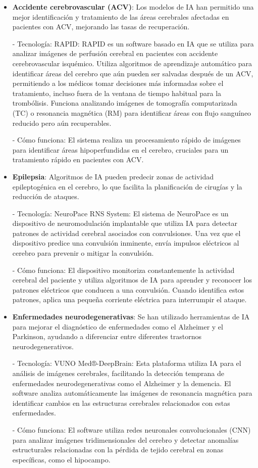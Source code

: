 \documentclass{article}
\begin{document}
\begin{itemize}
    \item \textbf{Accidente cerebrovascular (ACV)}: Los modelos de IA han permitido una mejor identificación y tratamiento de las áreas cerebrales afectadas en pacientes con ACV, mejorando las tasas de recuperación.
    
    - Tecnología: RAPID: RAPID es un software basado en IA que se utiliza para analizar imágenes de perfusión cerebral en pacientes con accidente cerebrovascular isquémico. Utiliza algoritmos de aprendizaje automático para identificar áreas del cerebro que aún pueden ser salvadas después de un ACV, permitiendo a los médicos tomar decisiones más informadas sobre el tratamiento, incluso fuera de la ventana de tiempo habitual para la trombólisis. Funciona analizando imágenes de tomografía computarizada (TC) o resonancia magnética (RM) para identificar áreas con flujo sanguíneo reducido pero aún recuperables.
    
    - Cómo funciona: El sistema realiza un procesamiento rápido de imágenes para identificar áreas hipoperfundidas en el cerebro, cruciales para un tratamiento rápido en pacientes con ACV.
    
    \item \textbf{Epilepsia}:
    Algoritmos de IA pueden predecir zonas de actividad epileptogénica en el cerebro, lo que facilita la planificación de cirugías y la reducción de ataques.
    
    - Tecnología: NeuroPace RNS System: El sistema de NeuroPace es un dispositivo de neuromodulación implantable que utiliza IA para detectar patrones de actividad cerebral asociados con convulsiones. Una vez que el dispositivo predice una convulsión inminente, envía impulsos eléctricos al cerebro para prevenir o mitigar la convulsión.
    
    - Cómo funciona: El dispositivo monitoriza constantemente la actividad cerebral del paciente y utiliza algoritmos de IA para aprender y reconocer los patrones eléctricos que conducen a una convulsión. Cuando identifica estos patrones, aplica una pequeña corriente eléctrica para interrumpir el ataque.
    
    \item \textbf{Enfermedades neurodegenerativas}:
    Se han utilizado herramientas de IA para mejorar el diagnóstico de enfermedades como el Alzheimer y el Parkinson, ayudando a diferenciar entre diferentes trastornos neurodegenerativos.
    
    - Tecnología: VUNO Med®-DeepBrain: Esta plataforma utiliza IA para el análisis de imágenes cerebrales, facilitando la detección temprana de enfermedades neurodegenerativas como el Alzheimer y la demencia. El software analiza automáticamente las imágenes de resonancia magnética para identificar cambios en las estructuras cerebrales relacionados con estas enfermedades.
    
    - Cómo funciona: El software utiliza redes neuronales convolucionales (CNN) para analizar imágenes tridimensionales del cerebro y detectar anomalías estructurales relacionadas con la pérdida de tejido cerebral en zonas específicas, como el hipocampo.
\end{itemize}
\end{document}
